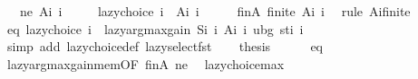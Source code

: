 \begin{isabellebody}
\ \ \ ne{\isacharcolon}{\kern0pt}\ {\isachardoublequoteopen}A{\isacharunderscore}{\kern0pt}i\ i\ {\isasymnoteq}\ {\isacharbraceleft}{\kern0pt}{\isacharbraceright}{\kern0pt}{\isachardoublequoteclose}\isanewline
\ \ \ {\isachardoublequoteopen}lazy{\isacharunderscore}{\kern0pt}choice\ i\ {\isasymin}\ A{\isacharunderscore}{\kern0pt}i\ i{\isachardoublequoteclose}\isanewline
%
\isadelimproof
%
\endisadelimproof
%
\isatagproof
{}\isamarkupfalse%
\ {\isacharminus}{\kern0pt}\isanewline
\ \ \isamarkupfalse%
\ finA{\isacharcolon}{\kern0pt}\ {\isachardoublequoteopen}finite\ {\isacharparenleft}{\kern0pt}A{\isacharunderscore}{\kern0pt}i\ i{\isacharparenright}{\kern0pt}{\isachardoublequoteclose}\ \isamarkupfalse%
\ {\isacharparenleft}{\kern0pt}rule\ A{\isacharunderscore}{\kern0pt}i{\isacharunderscore}{\kern0pt}finite{\isacharparenright}{\kern0pt}\isanewline
\ \ \isamarkupfalse%
\ eq{\isacharcolon}{\kern0pt}\ {\isachardoublequoteopen}lazy{\isacharunderscore}{\kern0pt}choice\ i\ {\isacharequal}{\kern0pt}\ lazy{\isacharunderscore}{\kern0pt}argmax{\isacharunderscore}{\kern0pt}gain\ {\isacharparenleft}{\kern0pt}S{\isacharunderscore}{\kern0pt}i\ i{\isacharparenright}{\kern0pt}\ {\isacharparenleft}{\kern0pt}A{\isacharunderscore}{\kern0pt}i\ i{\isacharparenright}{\kern0pt}\ {\isacharparenleft}{\kern0pt}ubg\ {\isacharparenleft}{\kern0pt}st{\isacharunderscore}{\kern0pt}i\ i{\isacharparenright}{\kern0pt}{\isacharparenright}{\kern0pt}{\isachardoublequoteclose}\isanewline
\ \ \ \ \isamarkupfalse%
\ {\isacharparenleft}{\kern0pt}simp\ add{\isacharcolon}{\kern0pt}\ lazy{\isacharunderscore}{\kern0pt}choice{\isacharunderscore}{\kern0pt}def\ lazy{\isacharunderscore}{\kern0pt}select{\isacharunderscore}{\kern0pt}fst{\isacharparenright}{\kern0pt}\isanewline
\ \ \isamarkupfalse%
\ {\isacharquery}{\kern0pt}thesis\isanewline
\ \ \ \ \isamarkupfalse%
\ eq\isanewline
\ \ \ \ \isamarkupfalse%
\ lazy{\isacharunderscore}{\kern0pt}argmax{\isacharunderscore}{\kern0pt}gain{\isacharunderscore}{\kern0pt}mem{\isacharbrackleft}{\kern0pt}OF\ finA\ ne{\isacharbrackright}{\kern0pt}\ \isakeywordONE{{\isachardot}{\kern0pt}}\isamarkupfalse%
\isanewline
{}\isamarkupfalse%
%
\endisatagproof
{\isafoldproof}%
%
\isadelimproof
\isanewline
%
\endisadelimproof
\isanewline
{}\isamarkupfalse%
\ lazy{\isacharunderscore}{\kern0pt}choice{\isacharunderscore}{\kern0pt}max{\isacharcolon}{\kern0pt}\isanewline

\end{isabellebody}
